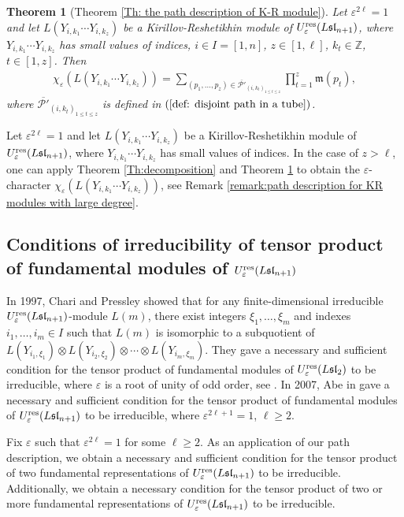 \documentclass[12pt, reqno]{amsart}
\newtheorem{theorem}{Theorem}[section]
\numberwithin{equation}{section}
\newcommand{\ZZ}{\mathbb{Z}}
\newcommand{\res}{{\rm res}}
\begin{document}
\begin{theorem}[Theorem \ref{Th: the path description of K-R module}]\label{TH:k-r}
Let $\varepsilon^{2 \ell}=1$ and let $L(Y_{i,k_1}\cdots Y_{i,k_z})$ be a Kirillov-Reshetikhin module of $U_{\varepsilon}^{\res}({L\mathfrak{sl}_{n+1}})$, where $Y_{i,k_1}\cdots Y_{i,k_z}$ has small values of indices, $i \in I=[1,n]$, $z \in [1, \ell]$, $k_t \in \ZZ$, $t \in [1,z]$. Then
\begin{align*}
\chi_{\varepsilon}(L(Y_{i,k_1}\cdots Y_{i,k_z}))=\sum_{(p_{1},\ldots,p_{z}) \in \overline{\mathscr{P'}}_{(i,k_{t})_{1 \leq t \leq z}}} \prod_{t=1}^{z}\mathfrak{m}(p_{t}),
\end{align*}
where $\overline{\mathscr{P'}}_{(i,k_{t})_{1\leq t\leq z}}$ is defined in $(\ref{def: disjoint path in a tube})$.
\end{theorem}

Let $\varepsilon^{2 \ell}=1$ and let $L(Y_{i,k_1}\cdots Y_{i,k_z})$ be a Kirillov-Reshetikhin module of $U_{\varepsilon}^{\res}({L\mathfrak{sl}_{n+1}})$, where $Y_{i,k_1}\cdots Y_{i,k_z}$ has small values of indices. In the case of $z> \ell$, one can apply Theorem \ref{Th:decomposition} and Theorem \ref{TH:k-r} to obtain the $\varepsilon$-character $\chi_{\varepsilon}(L(Y_{i,k_1}\cdots Y_{i,k_z}))$, see Remark \ref{remark:path description for KR modules with large degree}.

\subsection{Conditions of irreducibility of tensor product of fundamental modules of $U_{\varepsilon}^{\res}({L\mathfrak{sl}_{n+1}})$}
In 1997, Chari and Pressley showed that for any finite-dimensional irreducible $U_{\varepsilon}^{\res}({L\mathfrak{sl}_{n+1}})$-module $L(m)$, there exist integers $\xi_{1},\ldots, \xi_{m}$ and indexes $i_{1},\ldots, i_{m}\in I$ such that $L(m)$ is isomorphic to a subquotient of $L(Y_{i_1,\xi_{1}})\otimes L(Y_{i_2,\xi_2})\otimes \cdots \otimes L(Y_{i_m,\xi_m})$. They gave a necessary and sufficient condition for the tensor product of fundamental modules of $U_{\varepsilon}^{\res}({L\mathfrak{sl}_2})$ to be irreducible, where $\varepsilon$ is a root of unity of odd order, see {\cite[Theorem 9.6]{CP97b}}. In 2007, Abe in \cite{A07} gave a necessary and sufficient condition for the tensor product of fundamental modules of $U_{\varepsilon}^{\res}({L\mathfrak{sl}_{n+1}})$ to be irreducible, where $\varepsilon^{2\ell+1}=1$, $\ell\geq 2$.

Fix $\varepsilon$ such that $\varepsilon^{2\ell}=1$ for some $\ell \ge 2$. As an application of our path description, we obtain a necessary and sufficient condition for the tensor product of two fundamental representations of $U_{\varepsilon}^{\res}({L\mathfrak{sl}_{n+1}})$ to be irreducible. Additionally, we obtain a necessary condition for the tensor product of two or more fundamental representations of $U_{\varepsilon}^{\res}({L\mathfrak{sl}_{n+1}})$ to be irreducible.
\end{document}
